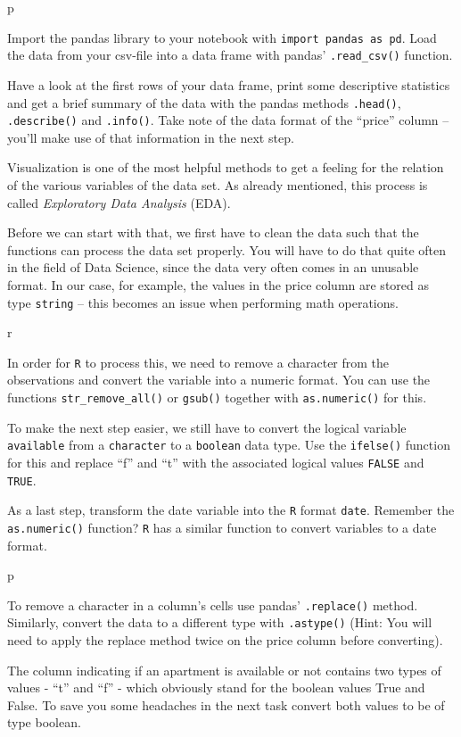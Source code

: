 \documentclass[
  11pt,
]{book}
\begin{document}
\begin{tipsp}p

Import the pandas library to your notebook with
\texttt{import\ pandas\ as\ pd}. Load the data from your csv-file into a
data frame with pandas' \texttt{.read\_csv()} function.

Have a look at the first rows of your data frame, print some descriptive
statistics and get a brief summary of the data with the pandas methods
\texttt{.head()}, \texttt{.describe()} and \texttt{.info()}. Take note
of the data format of the ``price'' column -- you'll make use of that
information in the next step.

\end{tipsp}

Visualization is one of the most helpful methods to get a feeling for
the relation of the various variables of the data set. As already
mentioned, this process is called \emph{Exploratory Data Analysis}
(EDA).

Before we can start with that, we first have to clean the data such that
the functions can process the data set properly. You will have to do
that quite often in the field of Data Science, since the data very often
comes in an unusable format. In our case, for example, the values in the
price column are stored as type \texttt{string} -- this becomes an issue
when performing math operations.

\begin{tips}r

In order for \texttt{R} to process this, we need to remove a character
from the observations and convert the variable into a numeric format.
You can use the functions \texttt{str\_remove\_all()} or \texttt{gsub()}
together with \texttt{as.numeric()} for this.

To make the next step easier, we still have to convert the logical
variable \texttt{available} from a \texttt{character} to a
\texttt{boolean} data type. Use the \texttt{ifelse()} function for this
and replace ``f'' and ``t'' with the associated logical values
\texttt{FALSE} and \texttt{TRUE}.

As a last step, transform the date variable into the \texttt{R} format
\texttt{date}. Remember the \texttt{as.numeric()} function? \texttt{R}
has a similar function to convert variables to a date format.

\end{tips}

\begin{tipsp}p

To remove a character in a column's cells use pandas'
\texttt{.replace()} method. Similarly, convert the data to a different
type with \texttt{.astype()} (Hint: You will need to apply the replace
method twice on the price column before converting).

The column indicating if an apartment is available or not contains two
types of values - ``t'' and ``f'' - which obviously stand for the
boolean values True and False. To save you some headaches in the next
task convert both values to be of type boolean.

\end{tipsp}
\end{document}
